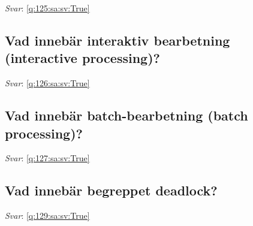 \documentclass[a4paper,11pt,oneside]{article}
\begin{document}
\begin{sloppypar}
\label{q:125:sa:sv:False}

\vspace{2cm}

\noindent\makebox[\textwidth]{\hrulefill}

\vspace{1cm}

\textit{Svar}: \autoref{q:125:sa:sv:True}



\subsection{Vad inneb\"ar interaktiv bearbetning (interactive processing)?}

\label{q:126:sa:sv:False}

\vspace{2cm}

\noindent\makebox[\textwidth]{\hrulefill}

\vspace{1cm}

\textit{Svar}: \autoref{q:126:sa:sv:True}



\subsection{Vad inneb\"ar batch-bearbetning (batch processing)?}

\label{q:127:sa:sv:False}

\vspace{2cm}

\noindent\makebox[\textwidth]{\hrulefill}

\vspace{1cm}

\textit{Svar}: \autoref{q:127:sa:sv:True}



\subsection{Vad inneb\"ar begreppet deadlock?}

\label{q:129:sa:sv:False}

\vspace{2cm}

\noindent\makebox[\textwidth]{\hrulefill}

\vspace{1cm}

\textit{Svar}: \autoref{q:129:sa:sv:True}




\end{sloppypar}
\end{document}
